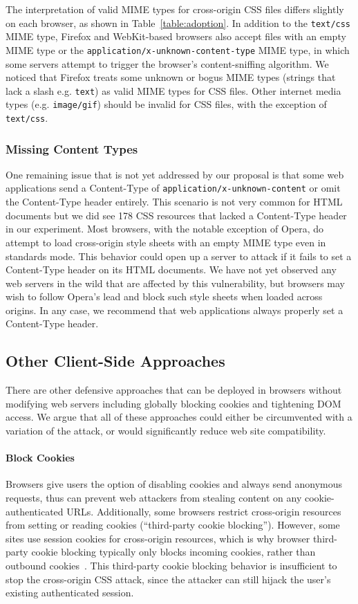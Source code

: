 \documentclass{acm_proc_article-sp}
\begin{document}
The interpretation of valid MIME types for cross-origin CSS files differs slightly on each browser, as shown in Table~\ref{table:adoption}. In addition to the \texttt{text/css} MIME type, Firefox and WebKit-based browsers also accept files with an empty MIME type or the \texttt{application/x-unknown-content-type} MIME type, in which some servers attempt to trigger the browser's content-sniffing algorithm. We noticed that Firefox treats some unknown or bogus MIME types (strings that lack a slash e.g. \texttt{text}) as valid MIME types for CSS files. Other internet media types (e.g. \texttt{image/gif}) should be invalid for CSS files, with the exception of \texttt{text/css}.

\subsubsection{Missing Content Types}

One remaining issue that is not yet addressed by our proposal is that some web
applications send a Content-Type of \verb|application/x-unknown-content|
or omit the Content-Type header entirely. 
This scenario is not very common for HTML documents but we did see 178 CSS resources that lacked a Content-Type header in our experiment. Most browsers,
with the notable exception of Opera, do attempt to load cross-origin
style sheets with an empty MIME type even in standards mode. 
This behavior could open up a server
to attack if it fails to set a Content-Type header on its HTML documents. We
have not yet observed any web servers in the wild that are affected by this
vulnerability, but browsers may wish to follow Opera's lead and block such
style sheets when loaded across origins. In any case, we recommend that web
applications always properly set a Content-Type header.

\subsection{Other Client-Side Approaches}
There are other defensive approaches that can be deployed in browsers without modifying web servers including globally blocking cookies and tightening DOM access.  We argue that all of these approaches could either be circumvented with a variation of the attack, or would significantly reduce web site compatibility.

\paragraph{Block Cookies}
Browsers give users the option of disabling cookies
and always send anonymous requests, thus can prevent web attackers from
stealing content on any cookie-authenticated URLs. Additionally, some browsers
restrict cross-origin resources from setting or reading cookies (``third-party
cookie blocking''). However, some sites use session cookies for cross-origin
resources, which is why browser third-party cookie blocking typically only
blocks incoming cookies, rather than outbound
cookies~\cite{jackson06thirdpartycookies}. This third-party cookie blocking
behavior is insufficient to stop the cross-origin CSS attack, since the
attacker can still hijack the user's existing authenticated session.
\end{document}
